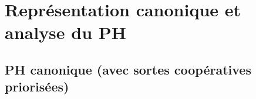
\chapter{Représentation canonique et analyse du PH}


\section{PH canonique (avec sortes coopératives priorisées)}
  
  




